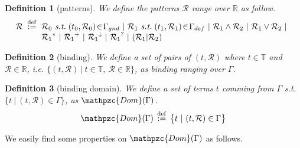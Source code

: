 \documentclass[12pt]{article}
\newtheorem{Definition}{Definition}[section]
\begin{document}
\begin{Definition}[patterns]
  We define the patterns $\mathcal{R}$ range over $\mathbb{R}$ as follow.
  \[ \mathcal{R} \;\stackrel{\mathrm{def}}{:=}\!
  \begin{array}[t]{l}
    \mathcal{R}_0 \ \text{\it s.t.}\; (t_0, \mathcal{R}_0) \!\in\!
     \Gamma_{gnd}\ |\ 
    \mathcal{R}_1\ \text{\it s.t.}\; (t_1, \mathcal{R}_1) \!\in\!
     \Gamma_{def}\ |\
    \mathcal{R}_1 \wedge \mathcal{R}_2 \ |\
     \mathcal{R}_1 \vee \mathcal{R}_2 \ |  \\
    {\mathcal{R}_1}^* \ |\ {\mathcal{R}_1}^+ \ |\
    {\mathcal{R}_1}^\downarrow \ |\ {\mathcal{R}_1}^? \ |\
    (\mathcal{R}_1 | \mathcal{R}_2)
  \end{array}
  \]
\end{Definition}


\begin{Definition}[binding]
  We define a set of pairs of $(t, \mathcal{R})$ where
  $t \in \mathbb{T}$ and $\mathcal{R} \in \mathbb{R}$, i.e.
  $\bigl\{(t, \mathcal{R}) \ |\ t \in \mathbb{T},\
  \mathcal{R} \in \mathbb{R} \bigr\}$, as binding ranging over $\Gamma$.
\end{Definition}


\begin{Definition}[binding domain]
  We define a set of terms $t$ comming from $\Gamma$ s.t.
  $\bigl\{ t \ |\ (t, \mathcal{R}) \in \Gamma \bigr\}$, as
  $\mathpzc{Dom}(\Gamma)$.
  \[ \mathpzc{Dom}(\Gamma) \,\stackrel{\mathrm{def}}{:=}\,
      \bigl\{ t \ |\ (t, \mathcal{R}) \in \Gamma \bigr\}
  \]
\end{Definition}


We easily find some properties on $\mathpzc{Dom}(\Gamma)$ as follows.
\end{document}
